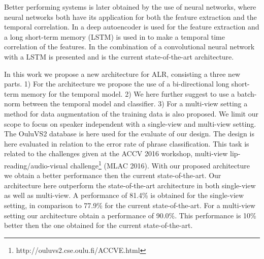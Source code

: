 Better performing systems is later obtained by the use of neural networks, where neural networks both have its application for both the feature extraction and the temporal correlation.
In \cite{Ngiam2011} a deep autoencoder is used for the feature extraction and a long short-term memory (LSTM) is used in \cite{Wand2016} to make a temporal time correlation of the features.
In \cite{Lee} the combination of a convolutional neural network with a LSTM is presented and is the current state-of-the-art architecture.

In this work we propose a new architecture for ALR, consisting a three new parts.
1) For the architecture we propose the use of a bi-directional long short-term memory for the temporal model.
2) We here further suggest to use a batch-norm between the temporal model and classifier.
3) For a multi-view setting a method for data augmentation of the training data is also proposed.
We limit our scope to focus on speaker independent with a single-view and multi-view setting.
The OuluVS2 database\cite{Anina2015} is here used for the evaluate of our design.
The design is here evaluated in relation to the error rate of phrase classification.
This task is related to the challenges given at the ACCV 2016 workshop, multi-view lip-reading/audio-visual challenge\footnote{http://ouluvs2.cse.oulu.fi/ACCVE.html} (MLAC 2016).
With our proposed architecture we obtain a better performance then the current state-of-the-art.
Our architecture here outperform the state-of-the-art architecture in both single-view as well as multi-view. 
A performance of 81.4\% is obtained for the single-view setting, in comparison to 77.9\% for the current state-of-the-art.
For a multi-view setting our architecture obtain a performance of 90.0\%.
This performance is 10\% better then the one obtained for the current state-of-the-art.

